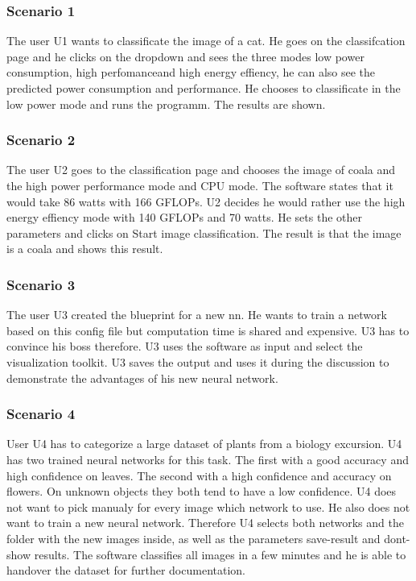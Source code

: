 \documentclass[parskip=full]{scrartcl}
\begin{document}
\subsubsection{Scenario 1}
The user U1 wants to classificate the image of a cat. He goes on the classifcation page and he clicks on the dropdown and sees the three modes \glqq low power consumption\grqq , \glqq high perfomance\grqq and \glqq high energy effiency\grqq , he can also see the predicted power consumption and performance. He chooses to classificate in the low power mode and runs the programm. The results are shown.
\subsubsection{Scenario 2}
The user U2 goes to the classification page and chooses the image of coala and the high power performance mode and CPU mode. The software states that it would take 86 watts with 166 GFLOPs. U2 decides he would rather use the high energy effiency mode with 140 GFLOPs and 70 watts. He sets the other parameters and clicks on Start image classification. The result is that the image is a coala and shows this result. 
\subsubsection{Scenario 3}
The user U3 created the blueprint for a new nn.
He wants to train a network based on this config file but computation time is shared and expensive. U3 has to convince his boss therefore.
U3 uses the software as input and select the visualization toolkit.
U3 saves the output and uses it during the discussion to demonstrate the advantages of his new neural network.
\clearpage
\subsubsection{Scenario 4}
User U4 has to categorize a large dataset of plants from a biology excursion. U4 has two trained neural networks for this task. The first with a good accuracy and high confidence on leaves. The second with a high confidence and accuracy on flowers. On unknown objects they both tend to have a low confidence. U4 does not want to pick manualy for every image which network to use. He also does not want to train a new neural network. Therefore U4 selects both networks and the folder with the new images inside, as well as the parameters save-result and dont-show results. The software classifies all images in a few minutes and he is able to handover the dataset for further documentation.
\end{document}
